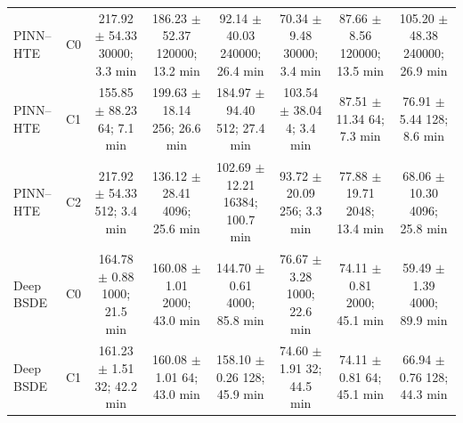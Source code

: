 \documentclass[10pt]{article}
\begin{document}
\begin{table}[t]
\begin{tabular}{llcccccc}
\addlinespace
PINN--HTE & C0 & \shortstack{217.92 $\pm$ 54.33\\30000; 3.3 min} & \shortstack{186.23 $\pm$ 52.37\\120000; 13.2 min} & \shortstack{92.14 $\pm$ 40.03\\240000; 26.4 min} & \shortstack{70.34 $\pm$ 9.48\\30000; 3.4 min} & \shortstack{87.66 $\pm$ 8.56\\120000; 13.5 min} & \shortstack{105.20 $\pm$ 48.38\\240000; 26.9 min} \\
PINN--HTE & C1 & \shortstack{155.85 $\pm$ 88.23\\64; 7.1 min} & \shortstack{199.63 $\pm$ 18.14\\256; 26.6 min} & \shortstack{184.97 $\pm$ 94.40\\512; 27.4 min} & \shortstack{103.54 $\pm$ 38.04\\4; 3.4 min} & \shortstack{87.51 $\pm$ 11.34\\64; 7.3 min} & \shortstack{76.91 $\pm$ 5.44\\128; 8.6 min} \\
PINN--HTE & C2 & \shortstack{217.92 $\pm$ 54.33\\512; 3.4 min} & \shortstack{136.12 $\pm$ 28.41\\4096; 25.6 min} & \shortstack{102.69 $\pm$ 12.21\\16384; 100.7 min} & \shortstack{93.72 $\pm$ 20.09\\256; 3.3 min} & \shortstack{77.88 $\pm$ 19.71\\2048; 13.4 min} & \shortstack{68.06 $\pm$ 10.30\\4096; 25.8 min} \\
\addlinespace
Deep BSDE & C0 & \shortstack{164.78 $\pm$ 0.88\\1000; 21.5 min} & \shortstack{160.08 $\pm$ 1.01\\2000; 43.0 min} & \shortstack{144.70 $\pm$ 0.61\\4000; 85.8 min} & \shortstack{76.67 $\pm$ 3.28\\1000; 22.6 min} & \shortstack{74.11 $\pm$ 0.81\\2000; 45.1 min} & \shortstack{59.49 $\pm$ 1.39\\4000; 89.9 min} \\
Deep BSDE & C1 & \shortstack{161.23 $\pm$ 1.51\\32; 42.2 min} & \shortstack{160.08 $\pm$ 1.01\\64; 43.0 min} & \shortstack{158.10 $\pm$ 0.26\\128; 45.9 min} & \shortstack{74.60 $\pm$ 1.91\\32; 44.5 min} & \shortstack{74.11 $\pm$ 0.81\\64; 45.1 min} & \shortstack{66.94 $\pm$ 0.76\\128; 44.3 min} \\

\end{tabular}
\end{table}
\end{document}

